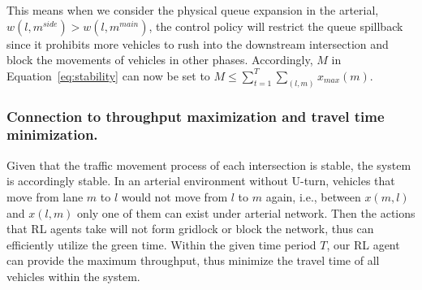 This means when we consider the physical queue expansion in the arterial, $w(l,m^{side}) > w(l,m^{main})$, the control policy will restrict the queue spillback since it prohibits more vehicles to rush into the downstream intersection and block the movements of vehicles in other phases. Accordingly, $M$ in Equation~\eqref{eq:stability} can now be set to $M\leq \sum_{t=1}^{T}\sum_{(l,m)} x_{max}(m)$. 

\subsubsection{Connection to throughput maximization and travel time minimization.} Given that the traffic movement process of each intersection is stable, the system is accordingly stable. In an arterial environment without U-turn, vehicles that move from lane $m$ to $l$ would not move from $l$ to $m$ again, i.e.,  between $x(m,l)$ and $x(l,m)$ only one of them can exist under arterial network. Then the actions that RL agents take will not form gridlock or block the network, thus can efficiently utilize the green time. Within the given time period $T$, our RL agent can provide the maximum throughput, thus minimize the travel time of all vehicles within the system.


   

